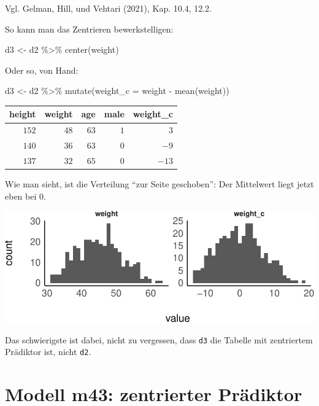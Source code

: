 \documentclass[
  a4paper,
  DIV=11]{scrreprt}
\newenvironment{Shaded}{\begin{snugshade}}{\end{snugshade}}
\newcommand{\AttributeTok}[1]{\textcolor[rgb]{0.40,0.45,0.13}{#1}}
\newcommand{\FunctionTok}[1]{\textcolor[rgb]{0.28,0.35,0.67}{#1}}
\newcommand{\NormalTok}[1]{\textcolor[rgb]{0.00,0.23,0.31}{#1}}
\newcommand{\OtherTok}[1]{\textcolor[rgb]{0.00,0.23,0.31}{#1}}
\newcommand{\SpecialCharTok}[1]{\textcolor[rgb]{0.37,0.37,0.37}{#1}}
\theoremstyle{definition}
\theoremstyle{remark}
\begin{document}
Vgl. Gelman, Hill, und Vehtari (2021), Kap. 10.4, 12.2.

So kann man das Zentrieren bewerkstelligen:

\begin{Shaded}
\begin{Highlighting}[]
\NormalTok{d3 }\OtherTok{\textless{}{-}} 
\NormalTok{  d2 }\SpecialCharTok{\%\textgreater{}\%} 
  \FunctionTok{center}\NormalTok{(weight)}
\end{Highlighting}
\end{Shaded}

Oder so, von Hand:

\begin{Shaded}
\begin{Highlighting}[]
\NormalTok{d3 }\OtherTok{\textless{}{-}}
\NormalTok{  d2 }\SpecialCharTok{\%\textgreater{}\%} 
  \FunctionTok{mutate}\NormalTok{(}\AttributeTok{weight\_c =}\NormalTok{ weight }\SpecialCharTok{{-}} \FunctionTok{mean}\NormalTok{(weight))}
\end{Highlighting}
\end{Shaded}

\begin{longtable}{rrrrr}
\toprule
height & weight & age & male & weight\_c \\ 
\midrule
$152$ & $48$ & $63$ & $1$ & $3$ \\ 
$140$ & $36$ & $63$ & $0$ & $-9$ \\ 
$137$ & $32$ & $65$ & $0$ & $-13$ \\ 
\bottomrule
\end{longtable}

Wie man sieht, ist die Verteilung ``zur Seite geschoben'': Der
Mittelwert liegt jetzt eben bei 0.

\includegraphics{./lineare-modelle_files/figure-pdf/Post-Regression-9-1.pdf}

Das schwierigste ist dabei, nicht zu vergessen, dass \texttt{d3} die
Tabelle mit zentriertem Prädiktor ist, nicht \texttt{d2}.

\hypertarget{modell-m43-zentrierter-pruxe4diktor}{%
\section{Modell m43: zentrierter
Prädiktor}\label{modell-m43-zentrierter-pruxe4diktor}}
\end{document}
